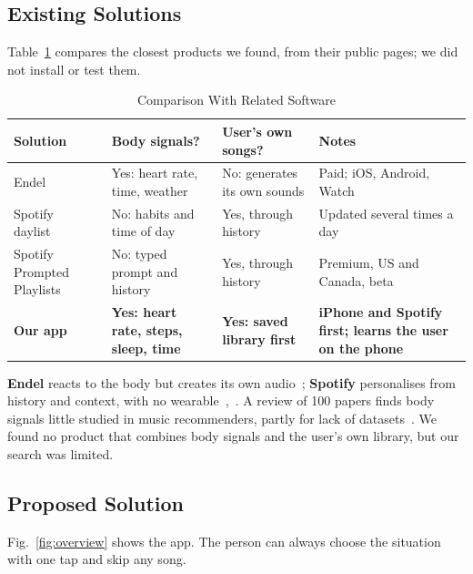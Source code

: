 \documentclass[conference]{IEEEtran}
\begin{document}
\subsection{Existing Solutions}\label{sec:related}
Table~\ref{tab:related} compares the closest products we found, from their public pages; we did not install or test them.

\begin{table}[H]
\centering
\caption{Comparison With Related Software}
\label{tab:related}
\scriptsize
\begin{tabularx}{\columnwidth}{|>{\raggedright\arraybackslash}p{1.25cm}|>{\raggedright\arraybackslash}X|>{\raggedright\arraybackslash}X|>{\raggedright\arraybackslash}X|}
\hline
\textbf{Solution} & \textbf{Body signals?} & \textbf{User's own songs?} & \textbf{Notes} \\ \hline
Endel~\cite{endel} & Yes: heart rate, time, weather & No: generates its own sounds & Paid; iOS, Android, Watch \\ \hline
Spotify daylist~\cite{daylist} & No: habits and time of day & Yes, through history & Updated several times a day \\ \hline
Spotify Prompted Playlists~\cite{prompted} & No: typed prompt and history & Yes, through history & Premium, US and Canada, beta \\ \hline
\textbf{Our app} & \textbf{Yes: heart rate, steps, sleep, time} & \textbf{Yes: saved library first} & \textbf{iPhone and Spotify first; learns the user on the phone} \\ \hline
\end{tabularx}
\end{table}

\textbf{Endel} reacts to the body but creates its own audio~\cite{endel}; \textbf{Spotify} personalises from history and context, with no wearable~\cite{daylist},~\cite{prompted}. A review of 100 papers finds body signals little studied in music recommenders, partly for lack of datasets~\cite{lozano}. We found no product that combines body signals and the user's own library, but our search was limited.

\subsection{Proposed Solution}\label{sec:solution}
Fig.~\ref{fig:overview} shows the app. The person can always choose the situation with one tap and skip any song.
\end{document}
